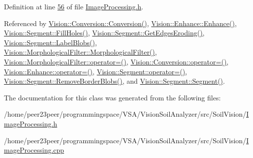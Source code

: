 Definition at line \hyperlink{_image_processing_8h_source_l00056}{56} of file \hyperlink{_image_processing_8h_source}{Image\+Processing.\+h}.



Referenced by \hyperlink{_conversion_8cpp_source_l00029}{Vision\+::\+Conversion\+::\+Conversion()}, \hyperlink{_enhance_8cpp_source_l00025}{Vision\+::\+Enhance\+::\+Enhance()}, \hyperlink{_segment_8cpp_source_l00615}{Vision\+::\+Segment\+::\+Fill\+Holes()}, \hyperlink{_segment_8cpp_source_l00483}{Vision\+::\+Segment\+::\+Get\+Edges\+Eroding()}, \hyperlink{_segment_8cpp_source_l00316}{Vision\+::\+Segment\+::\+Label\+Blobs()}, \hyperlink{_morphological_filter_8cpp_source_l00054}{Vision\+::\+Morphological\+Filter\+::\+Morphological\+Filter()}, \hyperlink{_morphological_filter_8cpp_source_l00062}{Vision\+::\+Morphological\+Filter\+::operator=()}, \hyperlink{_conversion_8cpp_source_l00041}{Vision\+::\+Conversion\+::operator=()}, \hyperlink{_enhance_8cpp_source_l00062}{Vision\+::\+Enhance\+::operator=()}, \hyperlink{_segment_8cpp_source_l00041}{Vision\+::\+Segment\+::operator=()}, \hyperlink{_segment_8cpp_source_l00245}{Vision\+::\+Segment\+::\+Remove\+Border\+Blobs()}, and \hyperlink{_segment_8cpp_source_l00026}{Vision\+::\+Segment\+::\+Segment()}.



The documentation for this class was generated from the following files\+:\begin{DoxyCompactItemize}
\item 
/home/peer23peer/programmingspace/\+V\+S\+A/\+Vision\+Soil\+Analyzer/src/\+Soil\+Vision/\hyperlink{_image_processing_8h}{Image\+Processing.\+h}\item 
/home/peer23peer/programmingspace/\+V\+S\+A/\+Vision\+Soil\+Analyzer/src/\+Soil\+Vision/\hyperlink{_image_processing_8cpp}{Image\+Processing.\+cpp}\end{DoxyCompactItemize}
